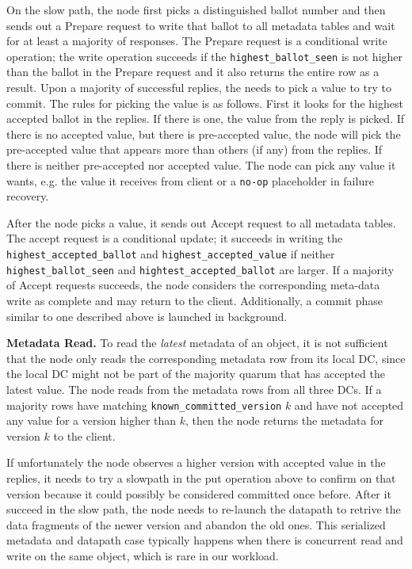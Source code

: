 On the slow path, the {\name} node first picks a distinguished ballot number
and then sends out a Prepare request to write that ballot to all metadata
tables and wait for at least a majority of responses. The Prepare request is a conditional
write operation; the write operation succeeds if the {\tt highest\_ballot\_seen} is not higher than 
the ballot in the Prepare request and it also returns the entire row as a result.
Upon a majority of successful replies, the {\name} needs to pick a value to try to commit.
The rules for picking the value is as follows. First it looks for the highest accepted ballot
in the replies. If there is one, the value from the reply is picked. If there is no accepted
value, but there is pre-accepted value, the {\name} node will pick the pre-accepted value
that appears more than others (if any) from the replies. If there is neither pre-accepted
nor accepted value. The {\name} node can pick any value it wants, e.g. the value it receives
from client or a \texttt{no-op} placeholder in failure recovery.

After the {\name} node picks a value, it sends out Accept request to all metadata tables.
The accept request is a conditional update; it succeeds in writing the {\tt
highest\_accepted\_ballot} and {\tt highest\_accepted\_value} if neither {\tt
highest\_ballot\_seen} and {\tt hightest\_accepted\_ballot} are larger.  If a
majority of Accept requests succeeds, the \name node considers the
corresponding meta-data write as complete and may return to the client.
Additionally, a commit phase similar to one described above is launched in
background.

{\bf Metadata Read.}
To read the \emph{latest} metadata of an object, it is not sufficient that the \name node 
only reads the corresponding metadata row from its local DC, since the local DC
might not be part of the majority quarum that has accepted the latest value.
The \name node reads from the metadata rows from all three DCs.  If a majority
rows have matching {\tt known\_committed\_version} $k$ and have not accepted
any value for a version higher than $k$, then the \name node returns the
metadata for version $k$ to the client.

If unfortunately the {\name} node observes a higher version with accepted value in the
replies, it needs to try a slowpath in the put operation above to confirm on that version
because it could possibly be considered committed once before. After it succeed in
the slow path, the {\name} node needs to re-launch the datapath to retrive the data
fragments of the newer version and abandon the old ones. This serialized metadata and
datapath case typically happens when there is concurrent read and write on the same
object, which is rare in our workload.

